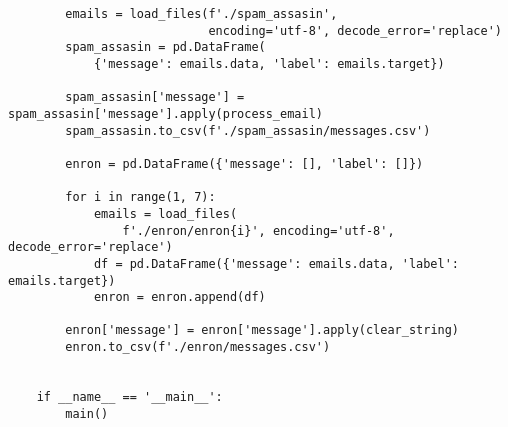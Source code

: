 \begin{lstlisting}
        emails = load_files(f'./spam_assasin',
                            encoding='utf-8', decode_error='replace')
        spam_assasin = pd.DataFrame(
            {'message': emails.data, 'label': emails.target})
    
        spam_assasin['message'] = spam_assasin['message'].apply(process_email)
        spam_assasin.to_csv(f'./spam_assasin/messages.csv')
    
        enron = pd.DataFrame({'message': [], 'label': []})
    
        for i in range(1, 7):
            emails = load_files(
                f'./enron/enron{i}', encoding='utf-8', decode_error='replace')
            df = pd.DataFrame({'message': emails.data, 'label': emails.target})
            enron = enron.append(df)
    
        enron['message'] = enron['message'].apply(clear_string)
        enron.to_csv(f'./enron/messages.csv')
    
    
    if __name__ == '__main__':
        main()
    
\end{lstlisting}
